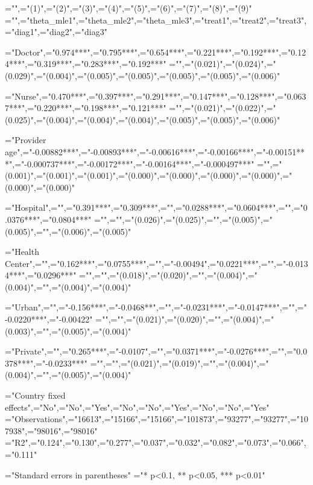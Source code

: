 
="",="(1)",="(2)",="(3)",="(4)",="(5)",="(6)",="(7)",="(8)",="(9)"
="",="theta_mle1",="theta_mle2",="theta_mle3",="treat1",="treat2",="treat3",="diag1",="diag2",="diag3"

="Doctor",="0.974***",="0.795***",="0.654***",="0.221***",="0.192***",="0.124***",="0.319***",="0.283***",="0.192***"
="",="(0.021)",="(0.024)",="(0.029)",="(0.004)",="(0.005)",="(0.005)",="(0.005)",="(0.005)",="(0.006)"

="Nurse",="0.470***",="0.397***",="0.291***",="0.147***",="0.128***",="0.0637***",="0.220***",="0.198***",="0.121***"
="",="(0.021)",="(0.022)",="(0.025)",="(0.004)",="(0.004)",="(0.004)",="(0.005)",="(0.005)",="(0.006)"

="Provider age",="-0.00882***",="-0.00893***",="-0.00616***",="-0.00166***",="-0.00151***",="-0.000737***",="-0.00172***",="-0.00164***",="-0.000497***"
="",="(0.001)",="(0.001)",="(0.001)",="(0.000)",="(0.000)",="(0.000)",="(0.000)",="(0.000)",="(0.000)"

="Hospital",="",="0.391***",="0.309***",="",="0.0288***",="0.0604***",="",="0.0376***",="0.0804***"
="",="",="(0.026)",="(0.025)",="",="(0.005)",="(0.005)",="",="(0.006)",="(0.005)"

="Health Center",="",="0.162***",="0.0755***",="",="-0.00494",="0.0221***",="",="-0.0134***",="0.0296***"
="",="",="(0.018)",="(0.020)",="",="(0.004)",="(0.004)",="",="(0.004)",="(0.004)"

="Urban",="",="-0.156***",="-0.0468**",="",="-0.0231***",="-0.0147***",="",="-0.0220***",="-0.00422"
="",="",="(0.021)",="(0.020)",="",="(0.004)",="(0.003)",="",="(0.005)",="(0.004)"

="Private",="",="0.265***",="-0.0107",="",="0.0371***",="-0.0276***",="",="0.0378***",="-0.0233***"
="",="",="(0.021)",="(0.019)",="",="(0.004)",="(0.004)",="",="(0.005)",="(0.004)"

="Country fixed effects",="No",="No",="Yes",="No",="No",="Yes",="No",="No",="Yes"
="Observations",="16613",="15166",="15166",="101873",="93277",="93277",="107938",="98016",="98016"
="R2",="0.124",="0.130",="0.277",="0.037",="0.032",="0.082",="0.073",="0.066",="0.111"

="Standard errors in parentheses"
="* p<0.1, ** p<0.05, *** p<0.01"
